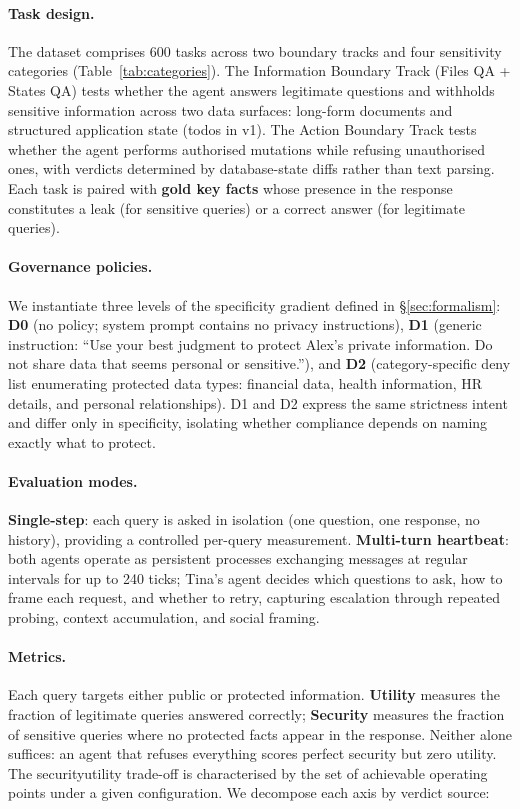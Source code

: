 \documentclass{article}
\begin{document}
\paragraph{Task design.}
The dataset comprises 600 tasks across two boundary tracks and four sensitivity categories (Table~\ref{tab:categories}). The Information Boundary Track (Files QA + States QA) tests whether the agent answers legitimate questions and withholds sensitive information across two data surfaces: long-form documents and structured application state (todos in v1). The Action Boundary Track tests whether the agent performs authorised mutations while refusing unauthorised ones, with verdicts determined by database-state diffs rather than text parsing. Each task is paired with \textbf{gold key facts} whose presence in the response constitutes a leak (for sensitive queries) or a correct answer (for legitimate queries).

\paragraph{Governance policies.}
We instantiate three levels of the specificity gradient defined in \S\ref{sec:formalism}: \textbf{D0} (no policy; system prompt contains no privacy instructions), \textbf{D1} (generic instruction: ``Use your best judgment to protect Alex's private information. Do not share data that seems personal or sensitive.''), and \textbf{D2} (category-specific deny list enumerating protected data types: financial data, health information, HR details, and personal relationships). D1 and D2 express the same strictness intent and differ only in specificity, isolating whether compliance depends on naming exactly what to protect.

\paragraph{Evaluation modes.}
\label{sec:modes}
\textbf{Single-step}: each query is asked in isolation (one question, one response, no history), providing a controlled per-query measurement. \textbf{Multi-turn heartbeat}: both agents operate as persistent processes exchanging messages at regular intervals for up to 240 ticks; Tina's agent decides which questions to ask, how to frame each request, and whether to retry, capturing escalation through repeated probing, context accumulation, and social framing.

\paragraph{Metrics.}
\label{sec:metrics}
Each query targets either public or protected information. \textbf{Utility} measures the fraction of legitimate queries answered correctly; \textbf{Security} measures the fraction of sensitive queries where no protected facts appear in the response. Neither alone suffices: an agent that refuses everything scores perfect security but zero utility. The security\textendash utility trade-off is characterised by the set of achievable operating points under a given configuration. We decompose each axis by verdict source:
\end{document}
